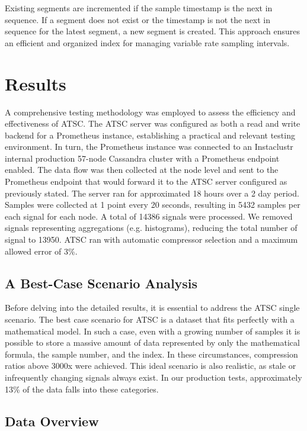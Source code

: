 \documentclass[conference]{IEEEtran}
\begin{document}
Existing segments are incremented if the sample timestamp is the next in sequence. If a segment does not exist or the timestamp is not the next in sequence for the latest segment, a new segment is created. This approach ensures an efficient and organized index for managing variable rate sampling intervals.

\section{Results}

A comprehensive testing methodology was employed to assess the efficiency and effectiveness of ATSC. The ATSC server was configured as both a read and write backend for a Prometheus\cite{prometheus} instance, establishing a practical and relevant testing environment. 
In turn, the Prometheus instance was connected to an Instaclustr internal production 57-node Cassandra\cite{cassandra} cluster with a Prometheus endpoint enabled. The data flow was then collected at the node level and sent to the Prometheus endpoint that would forward it to the ATSC server configured as previously stated.
The server ran for approximated 18 hours over a 2 day period. Samples were collected at 1 point every 20 seconds, resulting in 5432 samples per each signal for each node. A total of 14386 signals were processed.
We removed signals representing aggregations (e.g. histograms), reducing the total number of signal to 13950. ATSC ran with automatic compressor selection and a maximum allowed error of 3\%.

\subsection{A Best-Case Scenario Analysis}

Before delving into the detailed results, it is essential to address the ATSC single scenario.
The best case scenario for ATSC is a dataset that fits perfectly with a mathematical model.
In such a case, even with a growing number of samples it is possible to store a massive amount of data represented by only the mathematical formula, the sample number, and the index. In these circumstances, compression ratios above 3000x were achieved.
This ideal scenario is also realistic, as stale or infrequently changing signals always exist.
In our production tests, approximately 13\% of the data falls into these categories.

\subsection{Data Overview}
\end{document}
